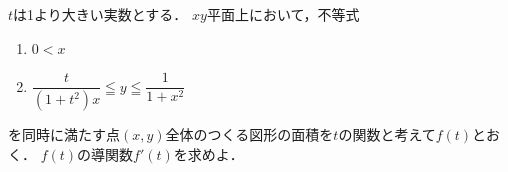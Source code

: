 \documentclass[../../main.tex]{subfiles}
\begin{document}
$t$は1より大きい実数とする．
$xy$平面上において，不等式
\begin{enumerate}
  \item $0<x$
  \item $\displaystyle\dfrac{t}{(1+t^2)x}\leqq y \leqq\dfrac{1}{1+x^2}$
\end{enumerate}
を同時に満たす点$(x,y)$全体のつくる図形の面積を$t$の関数と考えて$f(t)$とおく．
$f(t)$の導関数$f'(t)$を求めよ．
\end{document}
